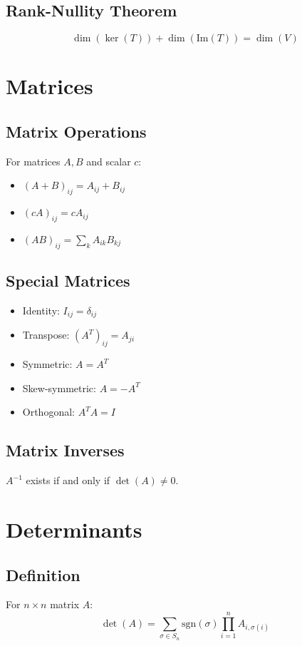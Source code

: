 \documentclass[11pt]{article}
\begin{document}
\subsection{Rank-Nullity Theorem}
$$\dim(\ker(T)) + \dim(\text{Im}(T)) = \dim(V)$$

\section{Matrices}

\subsection{Matrix Operations}
For matrices $A, B$ and scalar $c$:
\begin{itemize}
    \item $(A + B)_{ij} = A_{ij} + B_{ij}$
    \item $(cA)_{ij} = cA_{ij}$
    \item $(AB)_{ij} = \sum_k A_{ik}B_{kj}$
\end{itemize}

\subsection{Special Matrices}
\begin{itemize}
    \item Identity: $I_{ij} = \delta_{ij}$
    \item Transpose: $(A^T)_{ij} = A_{ji}$
    \item Symmetric: $A = A^T$
    \item Skew-symmetric: $A = -A^T$
    \item Orthogonal: $A^T A = I$
\end{itemize}

\subsection{Matrix Inverses}
$A^{-1}$ exists if and only if $\det(A) \neq 0$.

\section{Determinants}

\subsection{Definition}
For $n \times n$ matrix $A$:
$$\det(A) = \sum_{\sigma \in S_n} \text{sgn}(\sigma) \prod_{i=1}^n A_{i,\sigma(i)}$$
\end{document}
